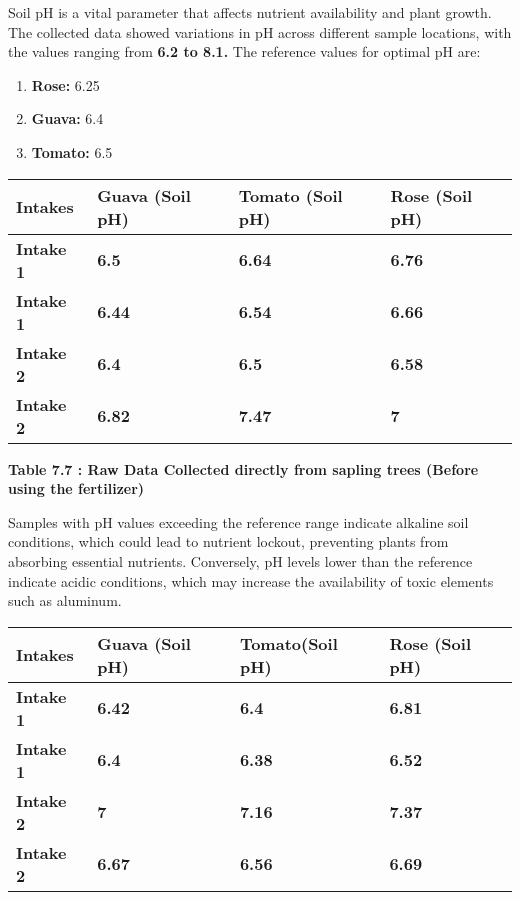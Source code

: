\documentclass{book} %
\begin{document}
\noindent Soil pH is a vital parameter that affects nutrient availability and plant growth. The collected data showed variations in pH across different sample locations, with the values ranging from \textbf{6.2 to 8.1.} The reference values for optimal pH are:

\begin{enumerate}
\item  \textbf{Rose:} 6.25

\item  \textbf{Guava:} 6.4

\item  \textbf{Tomato:} 6.5
\end{enumerate}

\noindent \textbf{}

\begin{tabular}{|p{0.7in}|p{0.7in}|p{0.8in}|p{0.7in}|} \hline 
\textbf{Intakes} & \textbf{Guava (Soil pH)} & \textbf{Tomato (Soil pH)} & \textbf{Rose (Soil pH)} \\ \hline 
\textbf{Intake 1} & \textbf{6.5} & \textbf{6.64} & \textbf{6.76} \\ \hline 
\textbf{Intake 1} & \textbf{6.44} & \textbf{6.54} & \textbf{6.66} \\ \hline 
\textbf{Intake 2} & \textbf{6.4} & \textbf{6.5} & \textbf{6.58} \\ \hline 
\textbf{Intake 2} & \textbf{6.82} & \textbf{7.47} & \textbf{7} \\ \hline 
\end{tabular}

\textbf{Table 7.7 : Raw Data Collected directly from sapling trees (Before using the fertilizer)}

\noindent Samples with pH values exceeding the reference range indicate alkaline soil conditions, which could lead to nutrient lockout, preventing plants from absorbing essential nutrients. Conversely, pH levels lower than the reference indicate acidic conditions, which may increase the availability of toxic elements such as aluminum.

\begin{tabular}{|p{0.7in}|p{0.7in}|p{0.8in}|p{0.7in}|} \hline 
\textbf{Intakes} & \textbf{Guava (Soil pH)} & \textbf{Tomato(Soil pH)} & \textbf{Rose (Soil pH)} \\ \hline 
\textbf{Intake 1} & \textbf{6.42} & \textbf{6.4} & \textbf{6.81} \\ \hline 
\textbf{Intake 1} & \textbf{6.4} & \textbf{6.38} & \textbf{6.52} \\ \hline 
\textbf{Intake 2} & \textbf{7} & \textbf{7.16} & \textbf{7.37} \\ \hline 
\textbf{Intake 2} & \textbf{6.67} & \textbf{6.56} & \textbf{6.69} \\ \hline 
\end{tabular}
\end{document}
